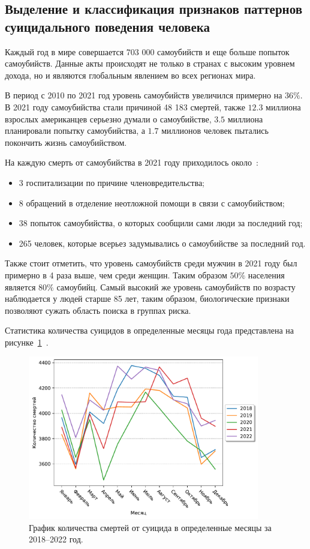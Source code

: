 \subsection{Выделение и классификация признаков паттернов суицидального поведения человека}

Каждый год в мире совершается 703 000 самоубийств и еще больше попыток самоубийств. Данные акты происходят не только в странах с высоким уровнем дохода, но и являются глобальным явлением во всех регионах мира.~\cite{suicideVOZDouble}

В период с 2010 по 2021 год уровень самоубийств увеличился примерно на $36\%$. 
В 2021 году самоубийства стали причиной 48 183 смертей, также $12.3$ миллиона взрослых американцев серьезно думали о самоубийстве, $3.5$ миллиона планировали попытку самоубийства, а $1.7$ миллионов человек пытались покончить жизнь самоубийством.~\cite{suicideStats}

На каждую смерть от самоубийства в 2021 году приходилось около~\cite{suicideStats}:
\begin{itemize}
	\item 3 госпитализации по причине членовредительства;
	\item 8 обращений в отделение неотложной помощи в связи с самоубийством;
	\item 38 попыток самоубийства, о которых сообщили сами люди за последний год;
	\item 265 человек, которые всерьез задумывались о самоубийстве за последний год. 
\end{itemize}

Также стоит отметить, что уровень самоубийств среди мужчин в 2021 году был примерно в 4 раза выше, чем среди женщин. 
Таким образом $50\%$ населения является $80\%$ самоубийц. 
Самый высокий же уровень самоубийств по возрасту наблюдается у людей старше 85 лет, таким образом, биологические признаки позволяют сужать область поиска в группах риска.

Статистика количества суицидов в определенные месяцы года представлена на рисунке~\ref{img:cdcsuicides}~\cite{suicideStats}.

\begin{figure}[H]
	\centering
	\includegraphics[width=0.9\textwidth]{inc/deathToMonth.pdf}
	\caption{ График количества смертей от суицида в определенные месяцы за 2018--2022 год. }\label{img:cdcsuicides}
\end{figure}

